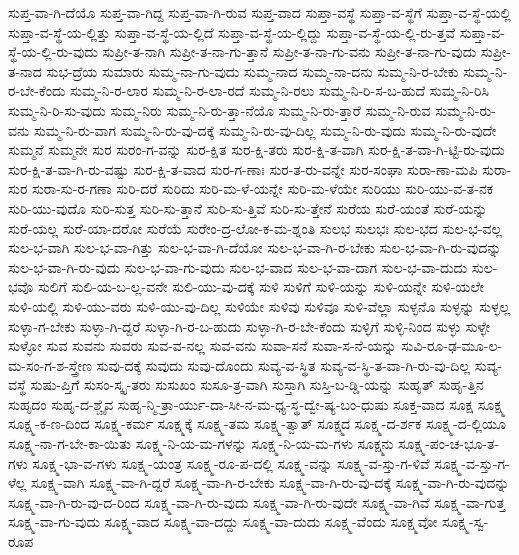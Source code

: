 {ಸುಪ್ತ-ವಾ-ಗಿ-ದೆಯೊ
ಸುಪ್ತ-ವಾ-ಗಿದ್ದ
ಸುಪ್ತ-ವಾ-ಗಿ-ರುವ
ಸುಪ್ತ-ವಾದ
ಸುಪ್ತಾ-ವಸ್ಥೆ
ಸುಪ್ತಾ-ವ-ಸ್ಥೆಗೆ
ಸುಪ್ತಾ-ವ-ಸ್ಥೆ-ಯಲ್ಲಿ
ಸುಪ್ತಾ-ವ-ಸ್ಥೆ-ಯ-ಲ್ಲಿತ್ತು
ಸುಪ್ತಾ-ವ-ಸ್ಥೆ-ಯ-ಲ್ಲಿದೆ
ಸುಪ್ತಾ-ವ-ಸ್ಥೆ-ಯ-ಲ್ಲಿದ್ದು
ಸುಪ್ತಾ-ವ-ಸ್ಥೆ-ಯ-ಲ್ಲಿ-ರು-ತ್ತವೆ
ಸುಪ್ತಾ-ವ-ಸ್ಥೆ-ಯ-ಲ್ಲಿ-ರು-ವುದು
ಸುಪ್ರೀ-ತ-ನಾಗಿ
ಸುಪ್ರೀ-ತ-ನಾ-ಗು-ತ್ತಾನೆ
ಸುಪ್ರೀ-ತ-ನಾ-ಗು-ವನು
ಸುಪ್ರೀ-ತ-ನಾ-ಗು-ವುದು
ಸುಪ್ರೀ-ತ-ನಾದ
ಸುಭ-ದ್ರೆಯ
ಸುಮಾರು
ಸುಮ್ಮ-ನಾ-ಗು-ವುದು
ಸುಮ್ಮ-ನಾದ
ಸುಮ್ಮ-ನಾ-ದನು
ಸುಮ್ಮ-ನಿ-ರ-ಬೇಕು
ಸುಮ್ಮ-ನಿ-ರ-ಬೇ-ಕೆಂದು
ಸುಮ್ಮ-ನಿ-ರ-ಲಾರ
ಸುಮ್ಮ-ನಿ-ರ-ಲಾ-ರದೆ
ಸುಮ್ಮ-ನಿ-ರಲು
ಸುಮ್ಮ-ನಿ-ರಿ-ಸ-ಬ-ಹುದೆ
ಸುಮ್ಮ-ನಿ-ರಿಸಿ
ಸುಮ್ಮ-ನಿ-ರಿ-ಸು-ವುದು
ಸುಮ್ಮ-ನಿರು
ಸುಮ್ಮ-ನಿ-ರು-ತ್ತಾ-ನೆಯೊ
ಸುಮ್ಮ-ನಿ-ರು-ತ್ತಾರೆ
ಸುಮ್ಮ-ನಿ-ರುವ
ಸುಮ್ಮ-ನಿ-ರು-ವನು
ಸುಮ್ಮ-ನಿ-ರು-ವಾಗ
ಸುಮ್ಮ-ನಿ-ರು-ವು-ದಕ್ಕೆ
ಸುಮ್ಮ-ನಿ-ರು-ವು-ದಿಲ್ಲ
ಸುಮ್ಮ-ನಿ-ರು-ವುದು
ಸುಮ್ಮ-ನಿ-ರು-ವುದೇ
ಸುಮ್ಮನೆ
ಸುಮ್ಮನೇ
ಸುರ
ಸುರಂ-ಗ-ವನ್ನು
ಸುರ-ಕ್ಷಿತ
ಸುರ-ಕ್ಷಿ-ತರು
ಸುರ-ಕ್ಷಿ-ತ-ವಾಗಿ
ಸುರ-ಕ್ಷಿ-ತ-ವಾ-ಗಿ-ಟ್ಟಿ-ರು-ವುದು
ಸುರ-ಕ್ಷಿ-ತ-ವಾ-ಗಿ-ರು-ವಷ್ಟು
ಸುರ-ಕ್ಷಿ-ತ-ವಾದ
ಸುರ-ಗ-ಣಾಃ
ಸುರ-ತ-ರು-ವನ್ನೇ
ಸುರ-ಸಂಘಾ
ಸುರಾ-ಣಾ-ಮಪಿ
ಸುರಾ-ಸುರ
ಸುರಾ-ಸು-ರ-ಗಣಾ
ಸುರಿ-ದರೆ
ಸುರಿದು
ಸುರಿ-ಮ-ಳೆ-ಯನ್ನೇ
ಸುರಿ-ಮ-ಳೆಯೇ
ಸುರಿಯು
ಸುರಿ-ಯು-ವ-ತ-ನಕ
ಸುರಿ-ಯು-ವುದೊ
ಸುರಿ-ಸುತ್ತ
ಸುರಿ-ಸು-ತ್ತಾನೆ
ಸುರಿ-ಸು-ತ್ತಿವೆ
ಸುರಿ-ಸು-ತ್ತೇನೆ
ಸುರೆಯ
ಸುರೆ-ಯಂತೆ
ಸುರೆ-ಯನ್ನು
ಸುರೆ-ಯಲ್ಲ
ಸುರೆ-ಯಾ-ದರೋ
ಸುರೆಯೆ
ಸುರೇಂ-ದ್ರ-ಲೋ-ಕ-ಮ-ಶ್ನಂತಿ
ಸುಲಭ
ಸುಲಭಃ
ಸುಲ-ಭದ
ಸುಲ-ಭ-ವಲ್ಲ
ಸುಲ-ಭ-ವಾಗಿ
ಸುಲ-ಭ-ವಾ-ಗಿತ್ತು
ಸುಲ-ಭ-ವಾ-ಗಿ-ದೆಯೋ
ಸುಲ-ಭ-ವಾ-ಗಿ-ರ-ಬೇಕು
ಸುಲ-ಭ-ವಾ-ಗಿ-ರು-ವುದನ್ನು
ಸುಲ-ಭ-ವಾ-ಗಿ-ರು-ವುದು
ಸುಲ-ಭ-ವಾ-ಗು-ವುದು
ಸುಲ-ಭ-ವಾದ
ಸುಲ-ಭ-ವಾ-ದಾಗ
ಸುಲ-ಭ-ವಾ-ದುದು
ಸುಲ-ಭವೊ
ಸುಲಿಗೆ
ಸುಲಿ-ಯ-ಬ-ಲ್ಲ-ವನೇ
ಸುಲಿ-ಯು-ವು-ದಕ್ಕೆ
ಸುಳಿ
ಸುಳಿಗೆ
ಸುಳಿ-ಯನ್ನು
ಸುಳಿ-ಯನ್ನೇ
ಸುಳಿ-ಯಲೇ
ಸುಳಿ-ಯಲ್ಲಿ
ಸುಳಿ-ಯು-ವರು
ಸುಳಿ-ಯು-ವು-ದಿಲ್ಲ
ಸುಳಿಯೇ
ಸುಳಿವು
ಸುಳಿವೂ
ಸುಳಿ-ವೆಲ್ಲಾ
ಸುಳ್ಳನೊ
ಸುಳ್ಳನ್ನು
ಸುಳ್ಳಲ್ಲ
ಸುಳ್ಳಾ-ಗ-ಬೇಕು
ಸುಳ್ಳಾ-ಗಿ-ದ್ದರೆ
ಸುಳ್ಳಾ-ಗಿ-ರ-ಬ-ಹುದು
ಸುಳ್ಳಾ-ಗಿ-ರ-ಬೇ-ಕೆಂದು
ಸುಳ್ಳಿಗೆ
ಸುಳ್ಳಿ-ನಿಂದ
ಸುಳ್ಳು
ಸುಳ್ಳೇ
ಸುಳ್ಳೋ
ಸುವ
ಸುವನು
ಸುವರು
ಸುವ-ವ-ನಲ್ಲ
ಸುವ-ವನು
ಸುವಾ-ಸನೆ
ಸುವಾ-ಸ-ನೆ-ಯನ್ನು
ಸುವಿ-ರೂ-ಢ-ಮೂ-ಲ-ಮ-ಸಂ-ಗ-ಶ-ಸ್ತ್ರೇಣ
ಸುವು-ದಕ್ಕೆ
ಸುವುದು
ಸುವು-ದೊಂದು
ಸುವ್ಯ-ವ-ಸ್ಥಿತ
ಸುವ್ಯ-ವ-ಸ್ಥಿ-ತ-ವಾ-ಗಿ-ರು-ವು-ದಿಲ್ಲ
ಸುವ್ಯ-ವಸ್ಥೆ
ಸುಷು-ಪ್ತಿಗೆ
ಸುಸಂ-ಸ್ಕೃ-ತರು
ಸುಸುಖಂ
ಸುಸೂ-ತ್ರ-ವಾಗಿ
ಸುಸ್ತಾಗಿ
ಸುಸ್ತಿ-ಬ-ಡ್ಡಿ-ಯನ್ನು
ಸುಹೃತ್
ಸುಹೃ-ತ್ತಿನ
ಸುಹೃದಂ
ಸುಹೃ-ದ-ಶ್ಚೈವ
ಸುಹೃ-ನ್ಮಿ-ತ್ರಾ-ರ್ಯು-ದಾ-ಸೀ-ನ-ಮ-ಧ್ಯ-ಸ್ಥ-ದ್ವೇ-ಷ್ಯ-ಬಂ-ಧುಷು
ಸೂಕ್ತ-ವಾದ
ಸೂಕ್ಷ
ಸೂಕ್ಷ್ಮ
ಸೂಕ್ಷ್ಮ-ಕ-ಣ-ದಿಂದ
ಸೂಕ್ಷ್ಮ-ಕರ್ಮ
ಸೂಕ್ಷ್ಮಕ್ಕೆ
ಸೂಕ್ಷ್ಮ-ತಮ
ಸೂಕ್ಷ್ಮ-ತ್ವಾತ್
ಸೂಕ್ಷ್ಮದ
ಸೂಕ್ಷ್ಮ-ದ-ರ್ಶಕ
ಸೂಕ್ಷ್ಮ-ದ-ಲ್ಲಿಯೂ
ಸೂಕ್ಷ್ಮ-ನಾ-ಗ-ಬೇ-ಕಾ-ಯಿತು
ಸೂಕ್ಷ್ಮ-ನಿ-ಯ-ಮ-ಗಳನ್ನು
ಸೂಕ್ಷ್ಮ-ನಿ-ಯ-ಮ-ಗಳು
ಸೂಕ್ಷ್ಮನು
ಸೂಕ್ಷ್ಮ-ಪಂ-ಚ-ಭೂ-ತ-ಗಳು
ಸೂಕ್ಷ್ಮ-ಭಾ-ವ-ಗಳು
ಸೂಕ್ಷ್ಮ-ಯಂತ್ರ
ಸೂಕ್ಷ್ಮ-ರೂ-ಪ-ದಲ್ಲಿ
ಸೂಕ್ಷ್ಮ-ವನ್ನು
ಸೂಕ್ಷ್ಮ-ವ-ಸ್ತು-ಗ-ಳಿವೆ
ಸೂಕ್ಷ್ಮ-ವ-ಸ್ತು-ಗ-ಳೆಲ್ಲ
ಸೂಕ್ಷ್ಮ-ವಾಗಿ
ಸೂಕ್ಷ್ಮ-ವಾ-ಗಿ-ದ್ದರೆ
ಸೂಕ್ಷ್ಮ-ವಾ-ಗಿ-ರ-ಬೇಕು
ಸೂಕ್ಷ್ಮ-ವಾ-ಗಿ-ರು-ವು-ದಕ್ಕೆ
ಸೂಕ್ಷ್ಮ-ವಾ-ಗಿ-ರು-ವುದನ್ನು
ಸೂಕ್ಷ್ಮ-ವಾ-ಗಿ-ರು-ವು-ದ-ರಿಂದ
ಸೂಕ್ಷ್ಮ-ವಾ-ಗಿ-ರು-ವುದು
ಸೂಕ್ಷ್ಮ-ವಾ-ಗಿ-ರು-ವುದೇ
ಸೂಕ್ಷ್ಮ-ವಾ-ಗಿವೆ
ಸೂಕ್ಷ್ಮ-ವಾ-ಗುತ್ತ
ಸೂಕ್ಷ್ಮ-ವಾ-ಗು-ವುದು
ಸೂಕ್ಷ್ಮ-ವಾದ
ಸೂಕ್ಷ್ಮ-ವಾ-ದದ್ದು
ಸೂಕ್ಷ್ಮ-ವಾ-ದುದು
ಸೂಕ್ಷ್ಮ-ವೆಂದು
ಸೂಕ್ಷ್ಮವೋ
ಸೂಕ್ಷ್ಮ-ಸ್ವ-ರೂಪ
}
